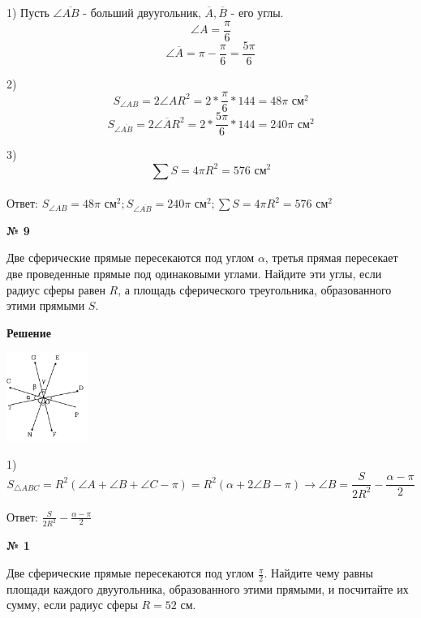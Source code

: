     1) Пусть $\angle \overline {AB}$ - больший двуугольник, $\overline A, \overline B$ - его углы.
    \[
        \angle A = \frac{\pi}{6}
    \]
    \[ \angle \overline A = \pi - \frac{\pi}{6} = \frac{5\pi}{6}\]

    2)
    \[
        S_{\angle AB} = 2\angle A R ^ 2 = 2 * \frac{\pi}{6} *  144 = 48\pi \text{ см}^2
    \]
    \[
        S_{\angle \overline{AB}} = 2\angle \overline A R ^ 2 = 2 * \frac{5\pi}{6} *  144 = 240\pi \text{ см}^2
    \]

    3)
    \[
        \sum S = 4\pi R ^ 2 = 576 \text{ см}^2
    \]\\

    Ответ: $S_{\angle AB} = 48\pi \text{ см}^2; S_{\angle \overline{AB}} = 240\pi \text{ см}^2; \sum S = 4\pi R ^ 2 = 576 \text{ см}^2$


    \begin{center}
        \textbf{№ 9}
    \end{center}

    Две сферические прямые пересекаются под углом $\alpha$, третья прямая пересекает две проведенные прямые
    под одинаковыми углами.
    Найдите эти углы, если радиус сферы равен $R$, а площадь сферического треугольника, образованного этими прямыми $S$.

    \textbf{Решение}\\

    \begin{center}
        \includegraphics[width=0.2\textwidth]{images/img4}\\
    \end{center}

    1)
    \[
        S_{\triangle ABC} = R^2(\angle A + \angle B + \angle C - \pi) =  R^2(\alpha + 2\angle B - \pi)\rightarrow
        \angle B = \frac{S}{2R^2} - \frac{\alpha- \pi}{2}
    \]

    Ответ: $\frac{S}{2R^2} - \frac{\alpha- \pi}{2} $

    \begin{center}
        \textbf{№ 1}
    \end{center}

     Две сферические прямые пересекаются под углом $\frac{\pi}{2}$.
    Найдите чему равны площади каждого двуугольника, образованного этими прямыми, и посчитайте их сумму,
    если радиус сферы $R=52$ см.

